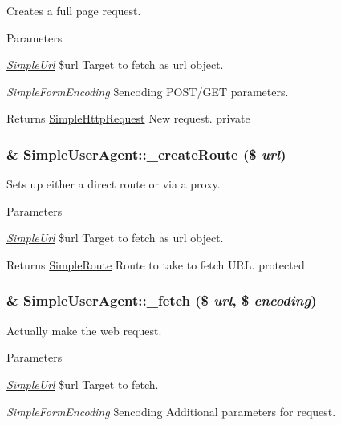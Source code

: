 \label{class_simple_user_agent_ac399bd23f974ae0c5633c5240beb4278}
Creates a full page request. 
\begin{DoxyParams}{Parameters}
\item[{\em \hyperlink{class_simple_url}{SimpleUrl}}]\$url Target to fetch as url object. \item[{\em SimpleFormEncoding}]\$encoding POST/GET parameters. \end{DoxyParams}
\begin{DoxyReturn}{Returns}
\hyperlink{class_simple_http_request}{SimpleHttpRequest} New request.  private 
\end{DoxyReturn}
\hypertarget{class_simple_user_agent_af275887be4e67789996d9db64a04d82a}{
\subsubsection[{\_\-createRoute}]{\setlength{\rightskip}{0pt plus 5cm}\& SimpleUserAgent::\_\-createRoute (\$ {\em url})}}
\label{class_simple_user_agent_af275887be4e67789996d9db64a04d82a}
Sets up either a direct route or via a proxy. 
\begin{DoxyParams}{Parameters}
\item[{\em \hyperlink{class_simple_url}{SimpleUrl}}]\$url Target to fetch as url object. \end{DoxyParams}
\begin{DoxyReturn}{Returns}
\hyperlink{class_simple_route}{SimpleRoute} Route to take to fetch URL.  protected 
\end{DoxyReturn}
\hypertarget{class_simple_user_agent_a52cd101862fafb36350e0e75bddee9a4}{
\subsubsection[{\_\-fetch}]{\setlength{\rightskip}{0pt plus 5cm}\& SimpleUserAgent::\_\-fetch (\$ {\em url}, \/  \$ {\em encoding})}}
\label{class_simple_user_agent_a52cd101862fafb36350e0e75bddee9a4}
Actually make the web request. 
\begin{DoxyParams}{Parameters}
\item[{\em \hyperlink{class_simple_url}{SimpleUrl}}]\$url Target to fetch. \item[{\em SimpleFormEncoding}]\$encoding Additional parameters for request. \end{DoxyParams}
